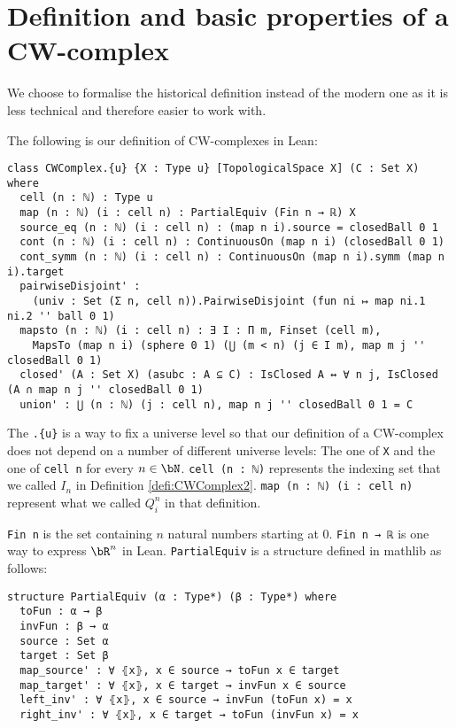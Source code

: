 \section{Definition and basic properties of a CW-complex}

We choose to formalise the historical definition instead of the modern one as it is less technical and therefore easier to work with.

The following is our definition of CW-complexes in Lean:

\begin{lstlisting}
class CWComplex.{u} {X : Type u} [TopologicalSpace X] (C : Set X) where
  cell (n : ℕ) : Type u
  map (n : ℕ) (i : cell n) : PartialEquiv (Fin n → ℝ) X
  source_eq (n : ℕ) (i : cell n) : (map n i).source = closedBall 0 1
  cont (n : ℕ) (i : cell n) : ContinuousOn (map n i) (closedBall 0 1)
  cont_symm (n : ℕ) (i : cell n) : ContinuousOn (map n i).symm (map n i).target
  pairwiseDisjoint' :
    (univ : Set (Σ n, cell n)).PairwiseDisjoint (fun ni ↦ map ni.1 ni.2 '' ball 0 1)
  mapsto (n : ℕ) (i : cell n) : ∃ I : Π m, Finset (cell m),
    MapsTo (map n i) (sphere 0 1) (⋃ (m < n) (j ∈ I m), map m j '' closedBall 0 1)
  closed' (A : Set X) (asubc : A ⊆ C) : IsClosed A ↔ ∀ n j, IsClosed (A ∩ map n j '' closedBall 0 1)
  union' : ⋃ (n : ℕ) (j : cell n), map n j '' closedBall 0 1 = C
\end{lstlisting}

The \lstinline|.{u}| is a way to fix a universe level so that our definition of a CW-complex does not depend on a number of different universe levels: The one of \lstinline{X} and the one of \lstinline{cell n} for every $n \in \bN$.
\lstinline{cell (n : ℕ)} represents the indexing set that we called $I_n$ in Definition \ref{defi:CWComplex2}. \lstinline{map (n : ℕ) (i : cell n)} represent what we called $Q_i^n$ in that definition. 

\lstinline{Fin n} is the set containing $n$ natural numbers starting at 0. 
\lstinline{Fin n → ℝ} is one way to express $\bR^n$ in Lean. 
\lstinline{PartialEquiv} is a structure defined in mathlib as follows: 

\begin{lstlisting}
structure PartialEquiv (α : Type*) (β : Type*) where
  toFun : α → β
  invFun : β → α
  source : Set α
  target : Set β
  map_source' : ∀ ⦃x⦄, x ∈ source → toFun x ∈ target
  map_target' : ∀ ⦃x⦄, x ∈ target → invFun x ∈ source
  left_inv' : ∀ ⦃x⦄, x ∈ source → invFun (toFun x) = x
  right_inv' : ∀ ⦃x⦄, x ∈ target → toFun (invFun x) = x
\end{lstlisting}

